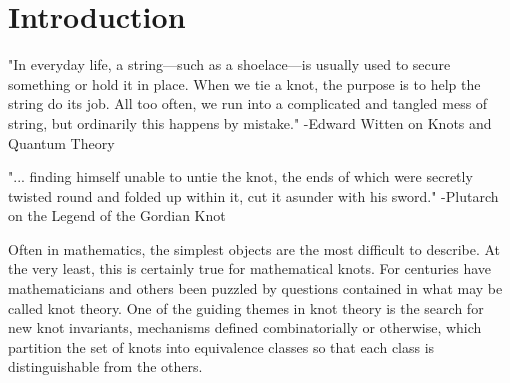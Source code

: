 \chapter{Introduction}

"In everyday life, a string—such as a shoelace—is usually used to secure something or hold it in place. When we tie a knot, the purpose is to help the string do its job. All too often, we run into a complicated and tangled mess of string, but ordinarily this happens by mistake." -Edward Witten on Knots and Quantum Theory

"... finding himself unable to untie the knot, the ends of which were secretly twisted round and folded up within it, cut it asunder with his sword." -Plutarch on the Legend of the Gordian Knot


Often in mathematics, the simplest objects are the most difficult to describe. At the very least, this is certainly true for mathematical knots. For centuries have mathematicians and others been puzzled by questions contained in what may be called knot theory. One of the guiding themes in knot theory is the search for new knot invariants, mechanisms defined combinatorially or otherwise, which partition the set of knots into equivalence classes so that each class is distinguishable from the others. 

